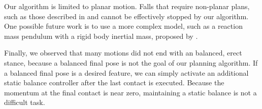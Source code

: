 
Our algorithm is limited to planar motion. Falls that require
non-planar plans, such as those described in \cite{Yun:2014:TFC} and
\cite{Goswami:2014:DCF} cannot be effectively stopped by our
algorithm. One possible future work is to use a more complex model,
such as a reaction mass pendulum with a rigid body inertial mass,
proposed by \cite{Goswami:2014:DCF}.

Finally, we observed that many motions did not end with an balanced,
erect stance, because a balanced final pose is not the goal of our
planning algorithm. If a balanced final pose is a desired feature, we
can simply activate an additional static balance controller after the last contact
is executed. Because the momentum at the final contact is near zero,
maintaining a static balance is not a difficult task.

